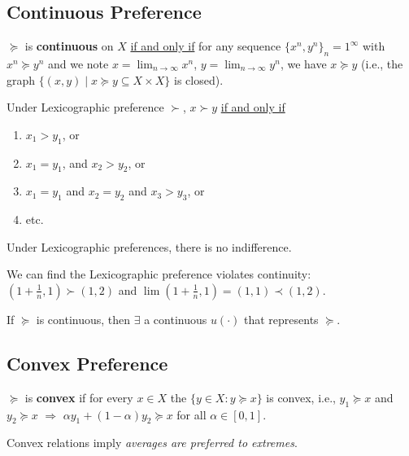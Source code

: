 \documentclass[11pt]{elegantbook}
\begin{document}
\subsection{Continuous Preference}
\begin{definition}
    \normalfont
    $\succeq$ is \textbf{continuous} on $X$ \underline{if and only if} for any sequence $\{x^n,y^n\}_n=1^\infty$ with $x^n\succeq y^n$ and we note $x=\lim_{n \rightarrow \infty}x^n$, $y=\lim_{n \rightarrow \infty}y^n$, we have $x\succeq y$ (i.e., the graph $\{(x,y)\mid x\succeq y\subseteq X\times X\}$ is closed).
\end{definition}
\begin{example}
    Under Lexicographic preference $\succ$, $x \succ y$ \underline{if and only if}
    \begin{enumerate}[$\circ$]
        \item $x_{1}>y_{1}$, or
        \item $x_{1}=y_{1}$, and $x_{2}>y_{2}$, or
        \item $x_{1}=y_{1}$ and $x_{2}=y_{2}$ and $x_{3}>y_{3}$, or
        \item etc.
    \end{enumerate}
    Under Lexicographic preferences, there is no indifference.
    
    We can find the Lexicographic preference violates continuity: $\left(1+\frac{1}{n}, 1\right) \succ(1,2)$ and $\lim \left(1+\frac{1}{n}, 1\right)=(1,1) \prec(1,2)$.
\end{example}

\begin{proposition}
    If $\succeq$ is continuous, then $\exists$ a continuous $u(\cdot)$ that represents $\succeq$.
\end{proposition}

\subsection{Convex Preference}
\begin{definition}
    \normalfont
    $\succeq$ is \textbf{convex} if for every $x\in X$ the $\{y\in X: y\succeq x\}$ is convex, i.e., $y_1\succeq x$ and $y_2\succeq x$ $\Rightarrow$ $\alpha y_1+ (1-\alpha) y_2\succeq x$ for all $\alpha\in[0,1]$.
\end{definition}
Convex relations imply \textit{averages are preferred to extremes}.
\end{document}

